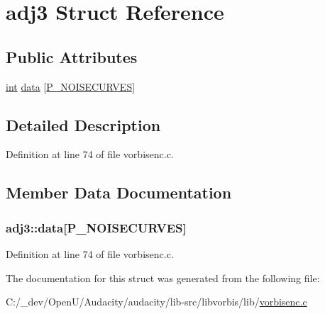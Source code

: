 \hypertarget{structadj3}{}\section{adj3 Struct Reference}
\label{structadj3}
\subsection*{Public Attributes}
\begin{DoxyCompactItemize}
\item 
\hyperlink{xmltok_8h_a5a0d4a5641ce434f1d23533f2b2e6653}{int} \hyperlink{structadj3_a8e4ba16608676b405538b4687c23f810}{data} \mbox{[}\hyperlink{psy_8h_a179ea3e4fa2cdb1ef235e922ea51405a}{P\+\_\+\+N\+O\+I\+S\+E\+C\+U\+R\+V\+ES}\mbox{]}
\end{DoxyCompactItemize}


\subsection{Detailed Description}


Definition at line 74 of file vorbisenc.\+c.



\subsection{Member Data Documentation}
\subsubsection[{\texorpdfstring{data}{data}}]{ adj3\+::data\mbox{[}{\bf P\+\_\+\+N\+O\+I\+S\+E\+C\+U\+R\+V\+ES}\mbox{]}}\hypertarget{structadj3_a8e4ba16608676b405538b4687c23f810}{}\label{structadj3_a8e4ba16608676b405538b4687c23f810}


Definition at line 74 of file vorbisenc.\+c.



The documentation for this struct was generated from the following file\+:\begin{DoxyCompactItemize}
\item 
C\+:/\+\_\+dev/\+Open\+U/\+Audacity/audacity/lib-\/src/libvorbis/lib/\hyperlink{vorbisenc_8c}{vorbisenc.\+c}\end{DoxyCompactItemize}
